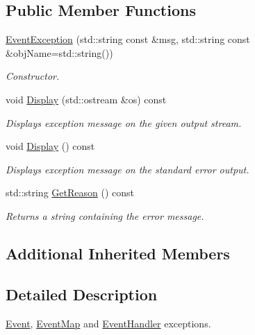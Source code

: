 \subsection*{Public Member Functions}
\begin{DoxyCompactItemize}
\item 
\hyperlink{class_common_1_1_event_exception_ade643b92ec36ce7a991aa832f54e9a2e}{Event\-Exception} (std\-::string const \&msg, std\-::string const \&obj\-Name=std\-::string())
\begin{DoxyCompactList}\small\item\em Constructor. \end{DoxyCompactList}\item 
void \hyperlink{class_common_1_1_event_exception_a9f09705ed5302e3f1c0b000e10b7292a}{Display} (std\-::ostream \&os) const 
\begin{DoxyCompactList}\small\item\em Displays exception message on the given output stream. \end{DoxyCompactList}\item 
\hypertarget{class_common_1_1_event_exception_a0f43e1355f256c8158c742af79d1195d}{void \hyperlink{class_common_1_1_event_exception_a0f43e1355f256c8158c742af79d1195d}{Display} () const }\label{class_common_1_1_event_exception_a0f43e1355f256c8158c742af79d1195d}

\begin{DoxyCompactList}\small\item\em Displays exception message on the standard error output. \end{DoxyCompactList}\item 
std\-::string \hyperlink{class_common_1_1_event_exception_a979706b5799fd0e3fd128a36f34ab8cb}{Get\-Reason} () const 
\begin{DoxyCompactList}\small\item\em Returns a string containing the error message. \end{DoxyCompactList}\end{DoxyCompactItemize}
\subsection*{Additional Inherited Members}


\subsection{Detailed Description}
\hyperlink{class_common_1_1_event}{Event}, \hyperlink{class_common_1_1_event_map}{Event\-Map} and \hyperlink{class_common_1_1_event_handler}{Event\-Handler} exceptions. 

